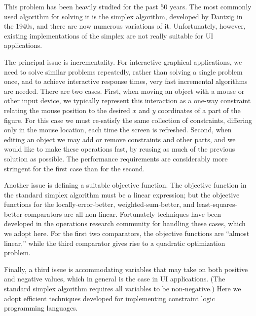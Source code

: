 \documentclass{article}
\newcommand{\ignore}[1]{}
\begin{document}
This problem has been heavily studied for the past 50 years.  The most
commonly used algorithm for solving it is the simplex algorithm, developed
by Dantzig in the 1940s, and there are now numerous variations of it. 
Unfortunately, however, existing implementations of the simplex
are not really suitable for UI applications.

The principal issue is incrementality.  For interactive graphical
applications, we need to solve similar problems repeatedly, rather than
solving a single problem once, and to achieve interactive response times,
very fast incremental algorithms are needed.  There are two cases.  First, when
moving an object with a mouse or other input device, we typically represent
this interaction as a one-way constraint relating the mouse position to the
desired $x$ and $y$ coordinates of a part of the figure.  For this case we
must re-satisfy the same collection of constraints, differing only in the
mouse location, each time the screen is refreshed.  Second, when editing an
object we may add or remove constraints and other parts, and we would like
to make these operations fast, by reusing as much of the previous solution
as possible.  The performance requirements are considerably more stringent
for the first case than for the second.  
\ignore{In Sections \ref{resolving} and
\ref{quadratic} we describe how to update an existing solution rapidly
given new inputs (e.g.\ a new mouse position), while in Sections
\ref{adding-constraints} and \ref{removing-constraints} we describe how to
add or delete a constraint incrementally.}

Another issue is defining a suitable objective function.  The objective
function in the standard simplex algorithm must be a linear expression; but
the objective functions for the locally-error-better,
weighted-sum-better, and least-squares-better comparators are all
non-linear.  Fortunately techniques have been developed in the operations
research community for handling these cases, which we adopt here.  For the
first two comparators, the objective functions are ``almost linear,''
while the third comparator gives rise to a quadratic
optimization problem.
\ignore{leading to the quasi-linear optimization technique described in Section
\ref{quasi-linear}.  Least-squares-better results in a quadratic
optimization problem, which is solved using the technique described in
Section \ref{quadratic}. } 

Finally, a third issue is accommodating variables that may take on both
positive and negative values, which in general is the case in UI
applications.  (The standard simplex algorithm requires all variables to be
non-negative.)  Here we adopt efficient techniques developed for
implementing constraint logic programming languages.
\end{document}
